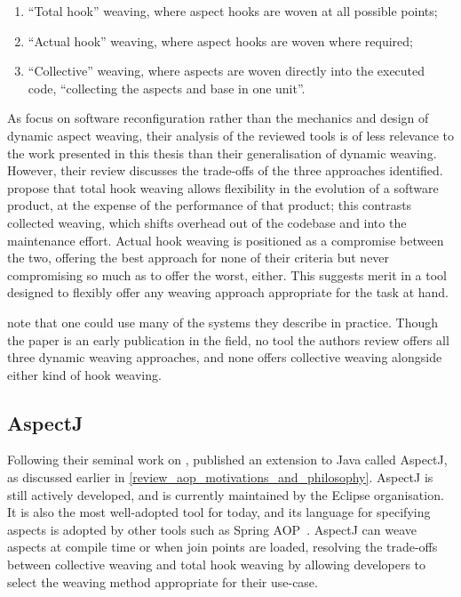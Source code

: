 \begin{enumerate}
\item ``Total hook'' weaving, where aspect hooks are woven at all possible
points;
\item ``Actual hook'' weaving, where aspect hooks are woven where required;
\item ``Collective'' weaving, where aspects are woven directly into the executed
code, ``collecting the aspects and base in one unit''.
\end{enumerate}

As \citeauthor{dynamicAOchitchyan} focus on software reconfiguration rather than
the mechanics and design of dynamic aspect weaving, their analysis of the
reviewed tools is of less relevance to the work presented in this thesis than
their generalisation of dynamic weaving. However, their review discusses the
trade-offs of the three approaches identified. \citeauthor{dynamicAOchitchyan}
propose that total hook weaving allows flexibility in the evolution of a
software product, at the expense of the performance of that product; this
contrasts collected weaving, which shifts overhead out of the codebase and into
the maintenance effort. Actual hook weaving is positioned as a compromise
between the two, offering the best approach for none of their criteria but never
compromising so much as to offer the worst, either. This suggests merit in a
tool designed to flexibly offer any weaving approach appropriate for the task at
hand.

\citeauthor{dynamicAOchitchyan} note that one could use many of
the systems they describe in practice. Though the paper is an early publication
in the field, no tool the authors review offers all three dynamic weaving
approaches, and none offers collective weaving alongside either kind of hook
weaving.

\subsection{AspectJ}

Following their seminal work on \aspectorientation{}, \citet{aspectj_intro}
published an \aop{} extension to Java called AspectJ, as discussed earlier in
\cref{review_aop_motivations_and_philosophy}. AspectJ is still actively
developed, and is currently maintained by the Eclipse organisation. It is also
the most well-adopted tool for \aop{} today, and its language for specifying
aspects is adopted by other tools such as Spring
AOP~\cite{introducing_spring_aop_chapter_integration_with_aspectj}. AspectJ can
weave aspects at compile time or when join points are loaded, resolving the
trade-offs between collective weaving and total hook weaving by allowing
developers to select the weaving method appropriate for their use-case.

